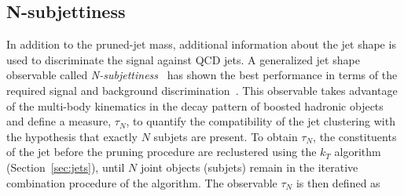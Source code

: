 

\subsection{N-subjettiness}
\label{subsec:nsubj}

In addition to the pruned-jet mass, additional information about the jet shape is used to discriminate the signal against QCD jets.
A generalized jet shape observable called \emph{N-subjettiness}~\cite{Thaler:2010tr} has shown the best performance in terms of the required signal and background discrimination~\cite{Khachatryan:2014vla}.
This observable takes advantage of the multi-body kinematics in the decay pattern of boosted hadronic objects and define a measure, $\tau_N$, to quantify the compatibility of the jet clustering with the hypothesis that exactly $N$ subjets are present.
To obtain $\tau_N$, the constituents of the jet before the pruning procedure are reclustered using the $k_T$ algorithm (Section~\ref{sec:jets}), until $N$ joint objects (subjets) remain in the iterative combination procedure of the algorithm. The observable $\tau_N$ is then defined as

